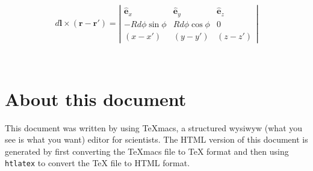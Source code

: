 \documentclass{llncs}
\begin{document}
\begin{equation}
  d\mathbf{l} \times (\mathbf{r}-\mathbf{r}') = \left|\begin{array}{ccc}
    \hat{\mathbf{e}}_x & \hat{\mathbf{e}}_y & \hat{\mathbf{e}}_z\\
    - R d \phi \sin \phi & R d \phi \cos \phi & 0\\
    (x - x') & (y - y') & (z - z')
  \end{array}\right|
\end{equation}


\

\section{About this document}

This document was written by using TeXmacs{\cite{texmacs}}, a structured
wysiwyw (what you see is what you want) editor for scientists. The HTML
version of this document is generated by first converting the TeXmacs file to
TeX format and then using {\texttt{htlatex}} to convert the TeX file to HTML
format.
\end{document}
